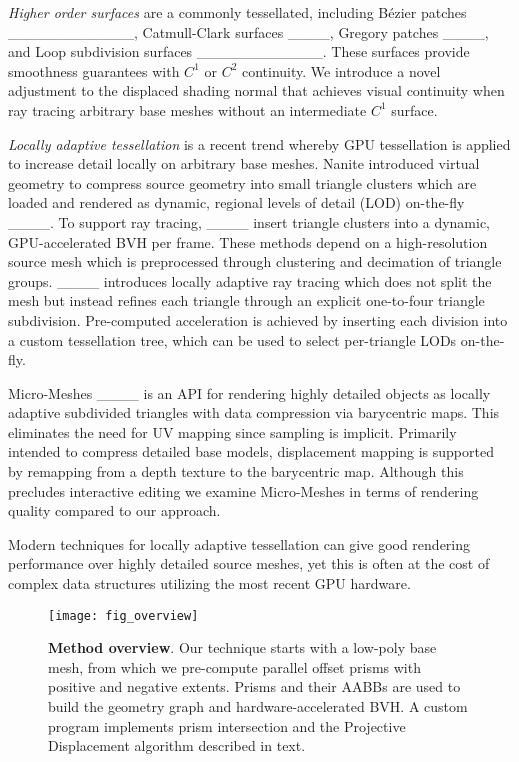 \textit{Higher order surfaces} are a commonly tessellated, including Bézier patches  ____________, Catmull-Clark surfaces ____, Gregory patches ____, and Loop subdivision surfaces ____________. These surfaces provide smoothness guarantees with $C^1$ or $C^2$ continuity. We introduce a novel adjustment to the displaced shading normal that achieves visual continuity when ray tracing arbitrary base meshes without an intermediate $C^1$ surface.

\textit{Locally adaptive tessellation} is a recent trend whereby GPU tessellation is applied to increase detail locally on arbitrary base meshes. Nanite introduced virtual geometry to compress source geometry into small triangle clusters which are loaded and rendered as dynamic, regional levels of detail (LOD) on-the-fly ____. To support ray tracing, ____ insert triangle clusters into a dynamic, GPU-accelerated BVH per frame. These methods depend on a high-resolution source mesh which is preprocessed through clustering and decimation of triangle groups.  ____ introduces locally adaptive ray tracing which does not split the mesh but instead refines each triangle through an explicit one-to-four triangle subdivision. Pre-computed acceleration is achieved by inserting each division into a custom tessellation tree, which can be used to select per-triangle LODs on-the-fly.

Micro-Meshes ____ is an API for rendering highly detailed objects as locally adaptive subdivided triangles with data compression via barycentric maps. This eliminates the need for UV mapping since sampling is implicit. Primarily  intended to compress detailed base models, displacement mapping is supported by remapping from a depth texture to the barycentric map. Although this precludes interactive editing we examine Micro-Meshes in terms of rendering quality compared to our approach. 

Modern techniques for locally adaptive tessellation can give good rendering performance over highly detailed source meshes, yet this is often at the cost of complex data structures utilizing the most recent GPU hardware.

\begin{figure}
  \texttt{[image: fig\_overview]}
  \caption{\textbf{Method overview}. Our technique starts with a low-poly base mesh, from which we pre-compute parallel offset prisms with positive and negative extents. Prisms and their AABBs are used to build the geometry graph and hardware-accelerated BVH. A custom program implements prism intersection and the Projective Displacement algorithm described in text.}
 \label{fig:overview}
\end{figure}